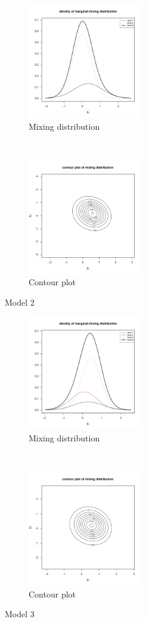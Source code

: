 \documentclass[10pt,a4paper]{article}
\begin{document}
	\begin{figure}[h!]
		\centering
		\begin{subfigure}[t]{0.5\textwidth}
			\centering
			\includegraphics[width=5cm]{results/train_C2/marginal.pdf}
			\caption{Mixing distribution}
		\end{subfigure}%
		~ 
		\begin{subfigure}[t]{0.5\textwidth}
			\centering
			\includegraphics[width=5cm]{results/train_C2/contour.pdf}
			\caption{Contour plot}
		\end{subfigure}
		\caption{Model 2}
	\end{figure}
	\begin{figure}[h!]
		\centering
		\begin{subfigure}[t]{0.5\textwidth}
			\centering
			\includegraphics[width=5cm]{results/train_C3/marginal.pdf}
			\caption{Mixing distribution}
		\end{subfigure}%
		~ 
		\begin{subfigure}[t]{0.5\textwidth}
			\centering
			\includegraphics[width=5cm]{results/train_C3/contour.pdf}
			\caption{Contour plot}
		\end{subfigure}
		\caption{Model 3}
	\end{figure}
\end{document}
